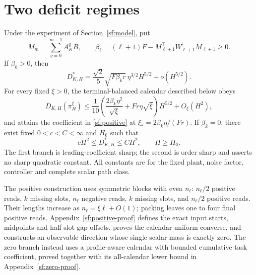 \section{Two deficit regimes}\label{sf:results}
\begin{theorem}\label{sf:two-regime}
Under the experiment of Section~\ref{sf:model}, put
\begin{equation}\label{sf:penalty}
M_m=\sum_{q=0}^{m-1}A_K^qB,\qquad
\beta_\ell=(\ell+1)F-M_{\ell+1}^\top W_{\ell+1}^\dagger M_{\ell+1}\ge0.
\end{equation}
If $\beta_k>0$, then
\begin{equation}\label{sf:positive}
D_{K,H}^*=\frac{\sqrt2}{5}\sqrt{F\beta_k r}\,\eta^{3/2}H^{5/2}
+o(H^{5/2}).
\end{equation}
For every fixed $\xi>0$, the terminal-balanced calendar described below obeys
\begin{equation}\label{sf:upper}
D_{K,H}(\pi_H^\xi)\le\frac1{10}
\left(\frac{2\beta_k\eta^2}{\sqrt\xi}+Fr\eta\sqrt\xi\right)H^{5/2}
+O_\xi(H^2),
\end{equation}
and attains the coefficient in \eqref{sf:positive} at
$\xi_*=2\beta_k\eta/(Fr)$. If $\beta_k=0$, there exist fixed
$0<c<C<\infty$ and $H_0$ such that
\begin{equation}\label{sf:zero}
cH^2\le D_{K,H}^*\le CH^2,\qquad H\ge H_0.
\end{equation}
The first branch is leading-coefficient sharp; the second is order sharp and
asserts no sharp quadratic constant. All constants are for the fixed plant,
noise factor, controller and complete scalar path class.
\end{theorem}

The positive construction uses symmetric blocks with even $n_\ell$:
$n_\ell/2$ positive reads, $k$ missing slots, $n_\ell$ negative reads,
$k$ missing slots, and $n_\ell/2$ positive reads. Their lengths increase as
$n_\ell=\xi\ell+O(1)$; packing leaves one to four final positive reads.
Appendix~\ref{sf:positive-proof} defines the exact input starts, midpoints
and half-slot gap offsets, proves the calendar-uniform converse, and constructs
an observable direction whose single scalar mass is exactly zero.
The zero branch instead uses a profile-aware calendar with bounded cumulative
task coefficient, proved together with its all-calendar lower bound in
Appendix~\ref{sf:zero-proof}.

